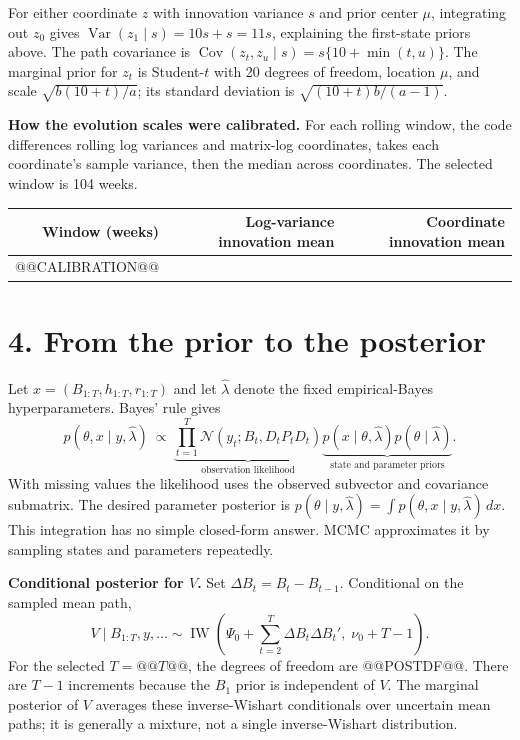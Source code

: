\documentclass[10pt,a4paper]{article}
\newcommand{\Normal}{\mathcal N}
\newcommand{\IW}{\operatorname{IW}}
\begin{document}
For either coordinate $z$ with innovation variance $s$ and prior center $\mu$, integrating
out $z_0$ gives $\operatorname{Var}(z_1\mid s)=10s+s=11s$, explaining the first-state priors above.
The path covariance is $\operatorname{Cov}(z_t,z_u\mid s)=s\{10+\min(t,u)\}$.
The marginal prior for $z_t$ is Student-$t$ with 20 degrees of freedom, location $\mu$,
and scale $\sqrt{b(10+t)/a}$; its standard deviation is $\sqrt{(10+t)b/(a-1)}$.

\textbf{How the evolution scales were calibrated.} For each rolling window, the code
differences rolling log variances and matrix-log coordinates, takes each coordinate's
sample variance, then the median across coordinates. The selected window is 104 weeks.
\begin{center}\small
\begin{tabular}{rrr}\toprule
Window (weeks) & Log-variance innovation mean & Coordinate innovation mean\\\midrule
@@CALIBRATION@@
\bottomrule\end{tabular}\end{center}

\clearpage
\section*{4. From the prior to the posterior}
Let $x=(B_{1:T},h_{1:T},r_{1:T})$ and let $\hat\lambda$ denote the fixed empirical-Bayes
hyperparameters. Bayes' rule gives
\[
p(\theta,x\mid y,\hat\lambda)\ \propto\
\underbrace{\prod_{t=1}^T\Normal(y_t;B_t,D_tP_tD_t)}_{\text{observation likelihood}}
\underbrace{p(x\mid\theta,\hat\lambda)p(\theta\mid\hat\lambda)}_{\text{state and parameter priors}}.
\]
With missing values the likelihood uses the observed subvector and covariance submatrix.
The desired parameter posterior is $p(\theta\mid y,\hat\lambda)=
\int p(\theta,x\mid y,\hat\lambda)\,dx$. This integration has no simple closed-form answer.
MCMC approximates it by sampling states and parameters repeatedly.

\textbf{Conditional posterior for $V$.} Set $\Delta B_t=B_t-B_{t-1}$. Conditional on
the sampled mean path,
\[
\boxed{V\mid B_{1:T},y,\ldots\sim
\IW\left(\Psi_0+\sum_{t=2}^T\Delta B_t\Delta B_t',\;\nu_0+T-1\right).}
\]
For the selected $T=@@T@@$, the degrees of freedom are @@POSTDF@@.
There are $T-1$ increments because the $B_1$ prior is independent of $V$.
The marginal posterior of $V$ averages these inverse-Wishart conditionals over uncertain
mean paths; it is generally a mixture, not a single inverse-Wishart distribution.
\end{document}
